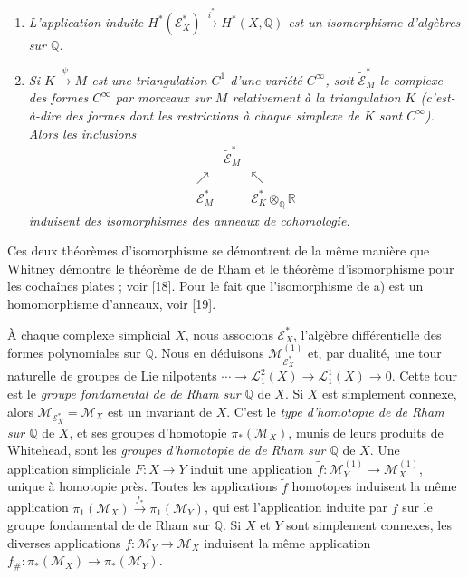 \documentclass[
  french,
  a3paper,
  a3paper]{extarticle}
\begin{document}
\begin{enumerate}
\def\labelenumi{\alph{enumi})}
\item
  \emph{L'application induite
  \(H^*(\mathscr E_X^*)\xrightarrow{i^*}H^*(X,\mathbb Q)\) est un
  isomorphisme d'algèbres sur \(\mathbb Q\).}
\item
  \emph{Si \(K\xrightarrow{\psi}M\) est une triangulation \(C^1\) d'une
  variété \(C^\infty\), soit \(\widetilde{\mathscr E}_M^*\) le complexe
  des formes \(C^\infty\) par morceaux sur \(M\) relativement à la
  triangulation \(K\) (c'est-à-dire des formes dont les restrictions à
  chaque simplexe de \(K\) sont \(C^\infty\)). Alors les inclusions} \[
  \begin{array}{ccc}
  &\widetilde{\mathscr E}_M^*&\\[-2mm]
  \nearrow&&\nwarrow\\[-2mm]
  \mathscr E_M^*&&\mathscr E_K^*\otimes_{\mathbb Q}\mathbb R
  \end{array}
  \] \emph{induisent des isomorphismes des anneaux de cohomologie.}
\end{enumerate}

Ces deux théorèmes d'isomorphisme se démontrent de la même manière que
Whitney démontre le théorème de de Rham et le théorème d'isomorphisme
pour les cochaînes plates ; voir {[}18{]}. Pour le fait que
l'isomorphisme de a) est un homomorphisme d'anneaux, voir {[}19{]}.

À chaque complexe simplicial \(X\), nous associons \(\mathscr E_X^*\),
l'algèbre différentielle des formes polynomiales sur \(\mathbb Q\). Nous
en déduisons \(\mathcal M_{\mathscr E_X^*}^{(1)}\) et, par dualité, une
tour naturelle de groupes de Lie nilpotents
\(\cdots\to\mathcal L_1^2(X)\to\mathcal L_1^1(X)\to0\). Cette tour est
le \emph{groupe fondamental de de Rham sur \(\mathbb Q\)} de \(X\). Si
\(X\) est simplement connexe, alors
\(\mathcal M_{\mathscr E_X^*}=\mathcal M_X\) est un invariant de \(X\).
C'est le \emph{type d'homotopie de de Rham sur \(\mathbb Q\)} de \(X\),
et ses groupes d'homotopie \(\pi_*(\mathcal M_X)\), munis de leurs
produits de Whitehead, sont les \emph{groupes d'homotopie de de Rham sur
\(\mathbb Q\)} de \(X\). Une application simpliciale \(F:X\to Y\) induit
une application \(\tilde f:\mathcal M_Y^{(1)}\to\mathcal M_X^{(1)}\),
unique à homotopie près. Toutes les applications \(\tilde f\) homotopes
induisent la même application
\(\pi_1(\mathcal M_X)\xrightarrow{f_*}\pi_1(\mathcal M_Y)\), qui est
l'application induite par \(f\) sur le groupe fondamental de de Rham sur
\(\mathbb Q\). Si \(X\) et \(Y\) sont simplement connexes, les diverses
applications \(f:\mathcal M_Y\to\mathcal M_X\) induisent la même
application \(f_\#:\pi_*(\mathcal M_X)\to\pi_*(\mathcal M_Y)\).
\end{document}
